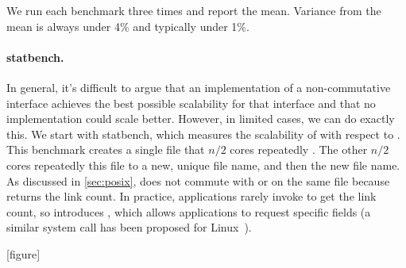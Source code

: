 We run each benchmark three times and report the mean.  Variance from
the mean is always under 4\% and typically under 1\%.  


\paragraph{statbench.} In general, it's difficult to argue that an
implementation of a
non-commutative interface achieves the best possible scalability for
that interface and that no implementation could scale better.  However,
in limited cases, we can do exactly this.  We start with statbench,
which measures the scalability of  with respect to
.  This benchmark creates a single file that $n/2$ cores
repeatedly . The other $n/2$ cores repeatedly
 this file to a new, unique file name, and then 
the new file name.  As discussed in \cref{sec:posix},  does not
commute with  or  on the same file because
 returns the link count.  In practice,
applications rarely invoke  to get the link count, so \sys
introduces , which allows applications to request specific
fields (a similar system call has been proposed for
Linux~\cite{linux:xstat}).


[figure]
\renewcommand{\themysubfigure}{\thefigure(\alph{mysubfigure})}



